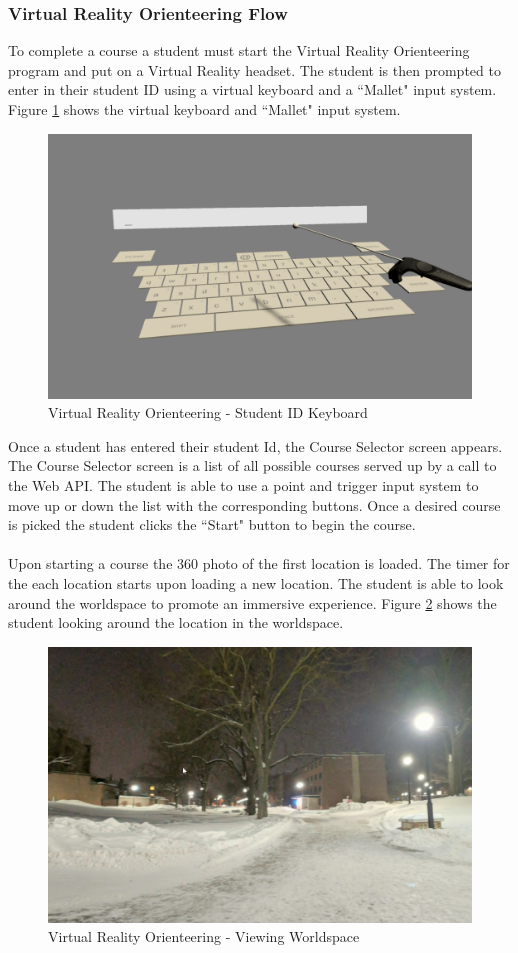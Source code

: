 \subsubsection{Virtual Reality Orienteering Flow}
To complete a course a student must start the Virtual Reality Orienteering program and put on a Virtual Reality headset. The student is then prompted to enter in their student ID using a virtual keyboard and a ``Mallet" input system. Figure \ref{VR Keyboard} shows the virtual keyboard and ``Mallet" input system.
\begin{figure}[h]
	\centering
	\includegraphics[width=.6\textwidth]{Requirements/assets/vr-keyboard.png}
	\caption[Virtual Reality Orienteering - Student ID Keyboard]{\label{VR Keyboard}Virtual Reality Orienteering - Student ID Keyboard}
\end{figure}
Once a student has entered their student Id, the Course Selector screen appears. The Course Selector screen is a list of all possible courses served up by a call to the Web API. The student is able to use a point and trigger input system to move up or down the list with the corresponding buttons. Once a desired course is picked the student clicks the ``Start" button to begin the course.\\
\\
Upon starting a course the 360 photo of the first location is loaded. The timer for the each location starts upon loading a new location. The student is able to look around the worldspace to promote an immersive experience. Figure \ref{VR Worldspace} shows the student looking around the location in the worldspace. 
\begin{figure}[htb]
	\centering
	\includegraphics[width=.6\textwidth]{Requirements/assets/vr-worldspace.png}
	\caption[Virtual Reality Orienteering - Veiwing Worldspace]{\label{VR Worldspace}Virtual Reality Orienteering - Viewing Worldspace}
\end{figure}
